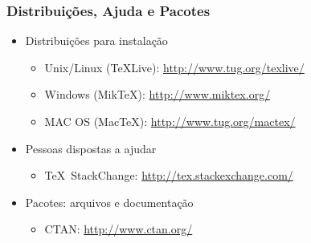 \begin{frame}
\frametitle{Distribuições, Ajuda e Pacotes}

\begin{itemize}
  \item Distribuições para instalação 
  \begin{itemize}
    \item Unix/Linux (TeXLive): \url{http://www.tug.org/texlive/}
  	\item Windows (MikTeX): \url{http://www.miktex.org/}
  	\item MAC OS (MacTeX): \url{http://www.tug.org/mactex/}
  \end{itemize}

  \item Pessoas dispostas a ajudar
  \begin{itemize}
 	 \item \TeX~StackChange: \url{http://tex.stackexchange.com/}
  \end{itemize}
  
  \item Pacotes: arquivos e documentação
  \begin{itemize}
  	\item CTAN: \url{http://www.ctan.org/}
  \end{itemize}
\end{itemize}
 
\end{frame}


